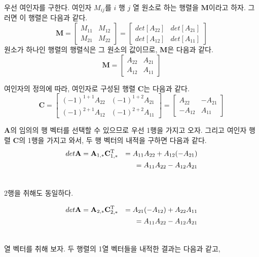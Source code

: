 우선 여인자를 구한다. 여인자 $M_{ij}$를 $i$ 행 $j$ 열 원소로 하는 행렬을 $\mathbf M$이라고 하자. 그러면 이 행렬은 다음과 같다.
$$
\mathbf M = 
\left [
\begin{array}{cc}
M_{11} & M_{12} \\
M_{21} & M_{22}
\end{array}
\right ] = 
\left [
\begin{array}{cc}
det \left [ A_{22} \right ] &
det \left [ A_{21} \right ] \\
det \left [ A_{12} \right ] &
det \left [ A_{11} \right ] 
\end{array}
\right ]
$$
원소가 하나인 행렬의 행렬식은 그 원소의 값이므로, $\mathbf M$은 다음과 같다.
$$
\mathbf M = 
\left [
\begin{array}{cc}
A_{22} & A_{21} \\
A_{12} & A_{11} 
\end{array}
\right ]
$$

여인자의 정의에 따라, 여인자로 구성된 행렬 $\mathbf C$는 다음과 같다.
$$
\mathbf C = 
\left [
\begin{array}{cc}
(-1)^{1+1} A_{22} & (-1)^{1+2} A_{21} \\
(-1)^{2+1} A_{12} & (-1)^{2+2} A_{11} 
\end{array}
\right ]
= \left [
\begin{array}{cc}
A_{22} & -A_{21} \\
-A_{12} & A_{11} 
\end{array}
\right ]
$$

$\mathbf A$의 임의의 행 벡터를 선택할 수 있으므로 우선 1행을 가지고 오자. 그리고 여인자 행렬 $\mathbf C$의 1행을 가지고 와서, 두 행 벡터의 내적을 
구하면 다음과 같다.
\begin{eqnarray}
det \mathbf A & = \mathbf A_{1,*}  \mathbf C_{1,*}^{\rm T} & =  A_{11}  A_{22} +  A_{12} (-  A_{21}) \\ \nonumber
& & =   A_{11}  A_{22} -  A_{12}  A_{21} \\ \nonumber
\end{eqnarray}

2행을 취해도 동일하다.

\begin{eqnarray}
det \mathbf A & =  \mathbf A_{2,*} \mathbf C_{2,*}^{\rm T} & =  A_{21} (-  A_{12}) +  A_{22}  A_{11} \\ \nonumber
& & =   A_{11}  A_{22} -  A_{12}  A_{21} \\ \nonumber
\end{eqnarray}

열 벡터를 취해 보자. 두 행렬의 1열 벡터들을 내적한 결과는 다음과 같고,

